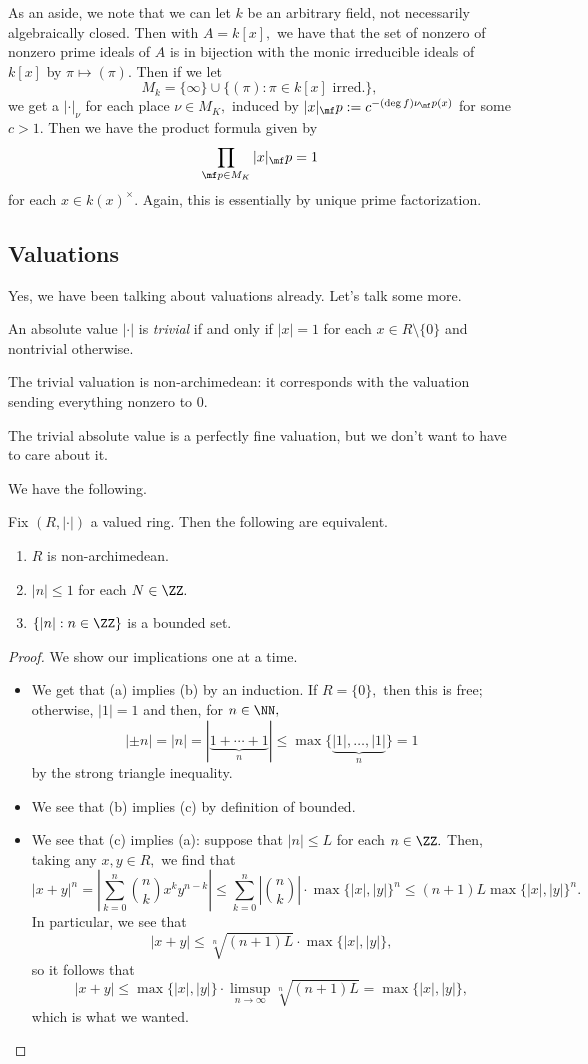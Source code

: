 \documentclass[../notes.tex]{subfiles}
\begin{document}
As an aside, we note that we can let $k$ be an arbitrary field, not necessarily algebraically closed. Then with $A=k[x],$ we have that the set of nonzero of nonzero prime ideals of $A$ is in bijection with the monic irreducible ideals of $k[x]$ by $\pi\mapsto(\pi).$ Then if we let
\[M_k=\{\infty\}\cup\{(\pi):\pi\in k[x]\text{ irred.}\},\]
we get a $|\cdot|_\nu$ for each place $\nu\in M_K,$ induced by $|x|_\mf p:=c^{-(\deg f)\nu_\mf p(x)}$ for some $c>1.$ Then we have the product formula given by
\[\prod_{\mf p\in M_K}|x|_\mf p=1\]
for each $x\in k(x)^\times.$ Again, this is essentially by unique prime factorization.

\subsection{Valuations}
Yes, we have been talking about valuations already. Let's talk some more.
\begin{definition}[Trivial]
	An absolute value $|\cdot|$ is \textit{trivial} if and only if $|x|=1$ for each $x\in R\setminus\{0\}$ and nontrivial otherwise.
\end{definition}
\begin{remark}
	The trivial valuation is non-archimedean: it corresponds with the valuation sending everything nonzero to $0.$
\end{remark}
The trivial absolute value is a perfectly fine valuation, but we don't want to have to care about it.

We have the following.
\begin{proposition}
	Fix $(R,|\cdot|)$ a valued ring. Then the following are equivalent.
	\begin{enumerate}[label=(\alph*)]
		\item $R$ is non-archimedean.
		\item $|n|\le1$ for each $N\in\ZZ.$
		\item $\{|n|:n\in\ZZ\}$ is a bounded set.
	\end{enumerate}
\end{proposition}
\begin{proof}
	We show our implications one at a time.
	\begin{itemize}
		\item We get that (a) implies (b) by an induction. If $R=\{0\},$ then this is free; otherwise, $|1|=1$ and then, for $n\in\NN,$
		\[|\pm n|=|n|=|\underbrace{1+\cdots+1}_n|\le\max\{\underbrace{|1|,\ldots,|1|}_n\}=1\]
		by the strong triangle inequality.
		\item We see that (b) implies (c) by definition of bounded.
		\item We see that (c) implies (a): suppose that $|n|\le L$ for each $n\in\ZZ.$ Then, taking any $x,y\in R,$ we find that
		\[|x+y|^n=\left|\sum_{k=0}^n\binom nkx^ky^{n-k}\right|\le\sum_{k=0}^n\left|\binom nk\right|\cdot\max\{|x|,|y|\}^n\le(n+1)L\max\{|x|,|y|\}^n.\]
		In particular, we see that
		\[|x+y|\le\sqrt[n]{(n+1)L}\cdot\max\{|x|,|y|\},\]
		so it follows that
		\[|x+y|\le\max\{|x|,|y|\}\cdot\limsup_{n\to\infty}\sqrt[n]{(n+1)L}=\max\{|x|,|y|\},\]
		which is what we wanted.
		\qedhere
	\end{itemize}
\end{proof}
\end{document}
